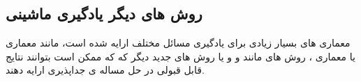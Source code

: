 \subsection{روش های دیگر یادگیری ماشینی}
معماری های بسیار زیادی برای یادگیری مسائل مختلف ارایه شده است، مانند معماری
یا معماری
،
روش های
مانند
و
و یا روش های جدید دیگر که
که ممکن است بتوانند نتایج قابل قبولی در حل مساله ی جداپذیری ارایه دهند.
